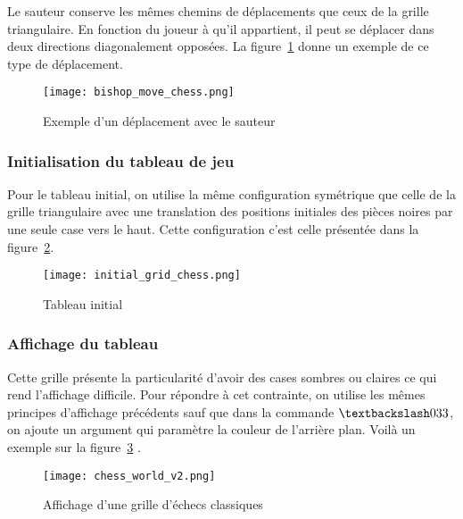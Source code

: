 \documentclass[11pt]{article}
\begin{document}
\begin{enumerate}
                    Le sauteur conserve les mêmes chemins de déplacements que ceux de la grille triangulaire. En fonction du joueur à qu'il appartient, il peut se déplacer dans deux directions diagonalement opposées. La figure~\ref{figure35} donne un exemple de ce type de déplacement.
                    \begin{figure}[h]
                                \centering
                                \texttt{[image: bishop\_move\_chess.png]}
                                \caption{ Exemple d'un déplacement avec le sauteur}
                                \label{figure35}
                                \end{figure}
                \end{enumerate}
            \subsubsection{Initialisation du tableau de jeu}
                Pour le tableau initial, on utilise la même configuration symétrique que celle de la grille triangulaire avec une translation des positions initiales des pièces noires par une seule case vers le haut. Cette configuration c'est celle présentée dans la figure~\ref{figure65}.
                \begin{figure}[h]
                                \centering
                                \texttt{[image: initial\_grid\_chess.png]}
                                \caption{ Tableau initial}
                                \label{figure65}
                                \end{figure}
  
            \subsubsection{Affichage du tableau}
            Cette grille présente la particularité d'avoir des cases sombres ou claires ce qui rend l'affichage difficile. Pour répondre à cet contrainte, on utilise les mêmes principes d'affichage précédents sauf que dans la commande $\textbackslash 033$, on ajoute un argument qui paramètre la couleur de l'arrière plan. Voilà un exemple sur la figure~\ref{figure66} .
            \begin{figure}[h]
                                \centering
                                \texttt{[image: chess\_world\_v2.png]}
                                \caption{ Affichage d'une grille d'échecs classiques}
                                \label{figure66}
                                \end{figure}
            \newpage
\end{document}
